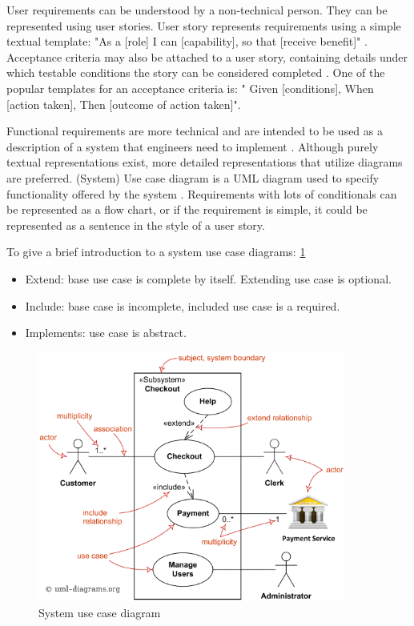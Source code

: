 User requirements can be understood by a non-technical person. They can be represented using user stories. User story represents requirements using a simple textual template: "As a [role] I can [capability], so that [receive benefit]" \cite{userStories}. Acceptance criteria may also be attached to a user story, containing details under which testable conditions the story can be considered completed \cite{Kannan2019User}. One of the popular templates for an acceptance criteria is: " Given [conditions], When [action taken], Then [outcome of action taken]". 

Functional requirements are more technical and are intended to be used as a description of a system that engineers need to implement \cite{wiegers2013software}. Although purely textual representations exist, more detailed representations that utilize diagrams are preferred. (System) Use case diagram is a UML diagram used to specify functionality offered by the system \cite{malan2001functional}. Requirements with lots of conditionals can be represented as a flow chart, or if the requirement is simple, it could be represented as a sentence in the style of a user story. 

To give a brief introduction to a system use case diagrams: \ref{fig:useCase}
\begin{itemize}
    \item Extend: base use case is complete by itself. Extending use case is optional.
    \item Include: base case is incomplete, included use case is a required.
    \item Implements: use case is abstract.
\end{itemize}
\begin{figure}
    
    \centering
    \includegraphics[width=0.9\textwidth,keepaspectratio]{../images/use-case-diagram-elements.png}
    \caption{System use case diagram}
    \label{fig:useCase}
\end{figure}

